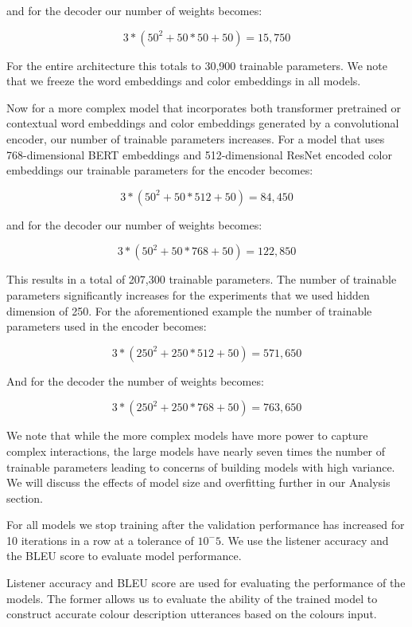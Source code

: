 \par
and for the decoder our number of weights becomes:

\[3*(50^2 + 50*50 +50) = 15,750\]

\par
For the entire architecture this totals to 30,900 trainable parameters. We note that we freeze the word embeddings and color embeddings in all models.

\par
Now for a more complex model that incorporates both transformer pretrained or contextual word embeddings and color embeddings generated by a convolutional encoder, our number of trainable parameters increases. For a model that uses 768-dimensional BERT embeddings and 512-dimensional ResNet encoded color embeddings our trainable parameters for the encoder becomes:

\[3*(50^2 + 50*512 +50) = 84,450\]

\par
and for the decoder our number of weights becomes:

\[3*(50^2 + 50*768 +50) = 122,850\]

\par
This results in a total of 207,300 trainable parameters. The number of trainable parameters significantly increases for the experiments that we used hidden dimension of 250. For the aforementioned example the number of trainable parameters used in the encoder becomes:

\[3*(250^2 + 250*512 +50) = 571,650\]

\par
And for the decoder the number of weights becomes:

\[3*(250^2 + 250*768 +50) = 763,650\]

\par
We note that while the more complex models have more power to capture complex interactions, the large models have nearly seven times the number of trainable parameters leading to concerns of building models with high variance. We will discuss the effects of model size and overfitting further in our Analysis section.

\par
For all models we stop training after the validation performance has increased for 10 iterations in a row at a tolerance of \(10^-5\). We use the listener accuracy and the BLEU score to evaluate model performance.

\par
Listener accuracy and BLEU score are used for evaluating the performance of the models. The former allows us to evaluate the ability of the trained model to construct accurate colour description utterances based on the colours input.

